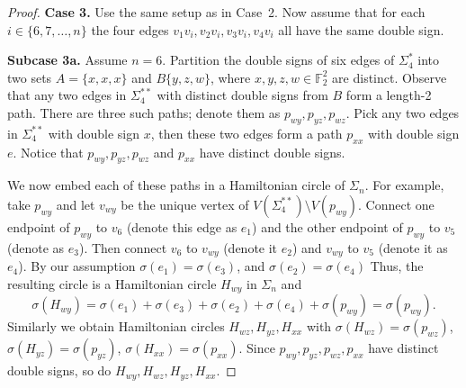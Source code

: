 \documentclass[12pt]{amsart}
\theoremstyle{plain}
\theoremstyle{definition}%
\begin{document}
\begin{proof}
\medskip

\textbf{Case 3.} Use the same setup as in Case~2. Now assume that for each \(i\in\{6,7,\ldots,n\}\) the four edges
\(v_1v_i, v_2v_i, v_3v_i, v_4v_i\) all have the same double sign.

\textbf{Subcase 3a.} Assume $n=6.$ 
Partition the double signs of six edges of \(\Sigma_4^*\) into two sets $A=\{x,x,x\}$ and $B\{y,z,w\}$, where $x,y,z,w\in\mathbb{F}_2^2$ are distinct. Observe that any two edges in \(\Sigma_4^{**}\) with distinct double signs from $B$ form a length-2 path. There are three such paths; denote them as $p_{wy}, p_{yz},p_{wz}$. Pick any two edges in \(\Sigma_4^{**}\) with double sign $x$, then these two edges form a path $p_{xx}$ with double sign $e$. Notice that $p_{wy}, p_{yz},p_{wz}$ and $p_{xx}$ have distinct double signs. 

We now embed each of these paths in a Hamiltonian circle of \(\Sigma_n\).
For example, take \(p_{wy}\) and let \(v_{wy}\) be the unique vertex of
\(V(\Sigma_4^{**})\setminus V(p_{wy})\).
Connect one endpoint of \(p_{wy}\) to \(v_6\) (denote this edge as $e_1$) and the other endpoint of \(p_{wy}\) to \(v_5\) (denote as $e_3$).  
Then connect \(v_6\) to \(v_{wy}\) (denote it $e_{2}$) and \(v_{wy}\) to \(v_5\) (denote it as $e_4$).  By our assumption $\sigma(e_1)=\sigma(e_3)$, and $\sigma(e_2)=\sigma(e_4)$
Thus, the resulting circle is a Hamiltonian circle \(H_{wy}\) in \(\Sigma_n\) and $$\sigma(H_{wy})=\sigma(e_1)+\sigma(e_3)+\sigma(e_2)+\sigma(e_4)+\sigma(p_{wy})=\sigma(p_{wy}).$$
Similarly we obtain Hamiltonian circles \(H_{wz}, H_{yz}, H_{xx}\) with
\(\sigma(H_{wz})=\sigma(p_{wz})\),
\(\sigma(H_{yz})=\sigma(p_{yz})\),
\(\sigma(H_{xx})=\sigma(p_{xx})\).
Since \(p_{wy}, p_{yz}, p_{wz}, p_{xx}\) have distinct double signs, so do
\(H_{wy}, H_{wz}, H_{yz}, H_{xx}\).





\end{proof}
\end{document}
